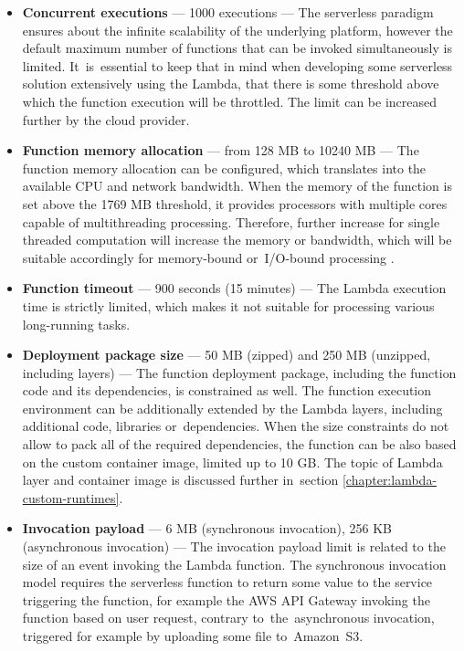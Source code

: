 \begin{itemize}
   \item \textbf{Concurrent executions} --- 1000 executions --- The serverless paradigm ensures about the infinite scalability of the underlying platform, however the default maximum number of functions that can be invoked simultaneously is limited. It~is~essential to keep that in mind when developing some serverless solution extensively using the Lambda, that there is some threshold above which the function execution will be throttled. The limit can be increased further by the cloud provider.
   \item \textbf{Function memory allocation} --- from 128 MB to 10240 MB --- The function memory allocation can be configured, which translates into the available CPU and network bandwidth. When the memory of the function is set above the 1769 MB threshold, it provides processors with multiple cores capable of multithreading processing. Therefore, further increase for single threaded computation will increase the memory or bandwidth, which will be suitable accordingly for memory-bound or~I/O-bound processing \cite{BecomeAServerlessBlackBelt}.
   \item \textbf{Function timeout} --- 900 seconds (15 minutes) --- The Lambda execution time is strictly limited, which makes it not suitable for processing various long-running tasks.
   \item \textbf{Deployment package size} --- 50 MB (zipped) and 250 MB (unzipped, including layers) --- The function deployment package, including the function code and its dependencies, is constrained as well. The function execution environment can be additionally extended by the Lambda layers, including additional code, libraries or~dependencies. When the size constraints do not allow to pack all of the required dependencies, the function can be also based on the custom container image, limited up to 10 GB. The topic of Lambda layer and container image is discussed further in~section \ref{chapter:lambda-custom-runtimes}.
   \item \textbf{Invocation payload} --- 6 MB (synchronous invocation), 256 KB (asynchronous invocation) --- The invocation payload limit is related to the size of an event invoking the Lambda function.
   The synchronous invocation model requires the serverless function to return some value to the service triggering the function, for example the AWS API Gateway invoking the function based on user request, contrary to~the~asynchronous invocation, triggered for example by uploading some file to~Amazon~S3.

\end{itemize}
